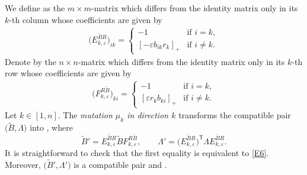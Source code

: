 \documentclass[10pt,a4paper]{amsart}
\numberwithin{equation}{section}
\begin{document}
We define  as the $m\times m$-matrix which differs from the identity matrix only in its $k$-th column whose coefficients are given by
 \begin{align*}
 \bigl(E_{k,\varepsilon}^{\tilde{B}R}\bigr)_{ik}=\begin{cases}
 -1& \text{if } i=k,\\
 [-\varepsilon b_{ik}r_k]_+& \text{if } i\neq k.
 \end{cases}
 \end{align*}
 Denote by  the $n\times n$-matrix which differs from the identity matrix only in its $k$-th row whose coefficients are given by
 \begin{align*}
 \bigl(F^{R\tilde{B}}_{k,\varepsilon}\bigr)_{ki}=\begin{cases}
 -1& \text{if } i=k,\\
 [\varepsilon r_{k}b_{ki}]_+& \text{if } i\neq k.
 \end{cases}
 \end{align*}
Let $k\in [1,n]$.
The {\it mutation $\mu_k$ in direction $k$} transforms the compatible pair $\bigl(\tilde{B},\Lambda\bigr)$ into , where
\[
\tilde{B}'=E_{k,\varepsilon}^{\tilde{B}R}\tilde{B}F_{k,\varepsilon}^{R\tilde{B}},\qquad \Lambda'=\bigl(E_{k,\varepsilon}^{\tilde{B}R}\bigr)^{\mathsf T}\Lambda E_{k,\varepsilon}^{\tilde{B}R}.
\]
It is straightforward to check that the first equality is equivalent to \eqref{E6}. Moreover, $\bigl(\tilde{B}', \Lambda'\bigr)$ is a compatible pair and .
\end{document}

